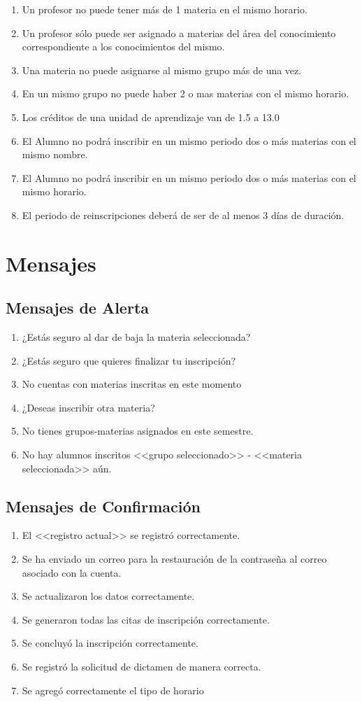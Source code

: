 \begin{enumerate}[{RN} 1.]
\item Un profesor no puede tener más de 1 materia en el mismo horario.
\item Un profesor sólo puede ser asignado a materias del área del conocimiento correspondiente a los conocimientos del mismo.
\item Una materia no puede asignarse al mismo grupo más de una vez.
\item En un mismo grupo no puede haber 2 o mas materias con el mismo horario.
\item Los créditos de una unidad de aprendizaje van de 1.5 a 13.0
\item El Alumno no podrá inscribir en un mismo periodo dos o más materias con el mismo nombre.
\item El Alumno no podrá inscribir en un mismo periodo dos o más materias con el mismo horario. 
\item El periodo de reinscripciones deberá de ser de al menos 3 días de duración.
\end{enumerate}
\section{Mensajes}
\subsection{Mensajes de Alerta}
\begin{enumerate}[{MA} 1.]
\item ¿Estás seguro al dar de baja la materia seleccionada?
\item ¿Estás seguro que quieres finalizar tu inscripción?
\item No cuentas con materias inscritas en este momento
\item ¿Deseas inscribir otra materia?
\item No tienes grupos-materias asignados en este semestre.
\item No hay alumnos inscritos <<grupo seleccionado>> - <<materia seleccionada>> aún.
\end{enumerate}
\subsection{Mensajes de Confirmación}
\begin{enumerate} [{MC} 1.]
\item El <<registro actual>> se registró correctamente.
\item Se ha enviado un correo para la restauración de la contraseña al correo asociado con la cuenta.
\item Se actualizaron los datos correctamente.
\item Se generaron todas las citas de inscripción correctamente.
\item Se concluyó la inscripción correctamente.
\item Se registró la solicitud de dictamen de manera correcta.
\item Se agregó correctamente el tipo de horario
\end{enumerate}
\newpage
